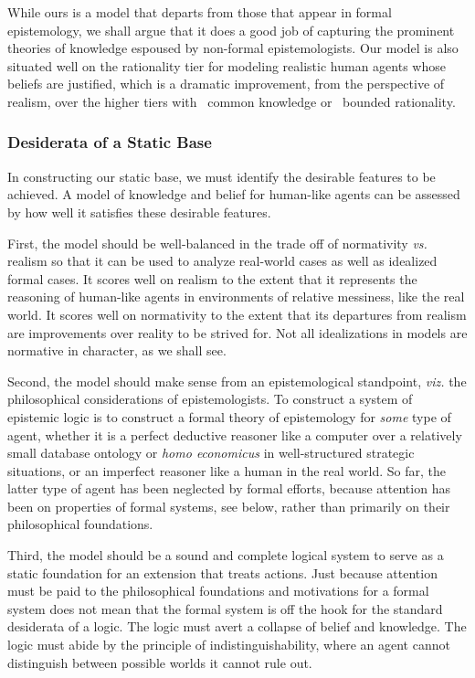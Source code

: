 While ours is a model that departs from those that appear in formal epistemology, we shall argue that it does a good job of capturing the prominent theories of knowledge espoused by non-formal epistemologists. Our model is also situated well on the rationality tier for modeling realistic human agents whose beliefs are justified, which is a dramatic improvement, from the perspective of realism, over the higher tiers with \SFive\ common knowledge or \SFive\ bounded rationality.

\subsubsection{Desiderata of a Static Base}
In constructing our static base, we must identify the desirable features to be achieved. A model of knowledge and belief for human-like agents can be assessed by how well it satisfies these desirable features. 

First, the model should be well-balanced in the trade off of normativity \emph{vs.} realism so that it can be used to analyze real-world cases as well as idealized formal cases. It scores well on realism to the extent that it represents the reasoning of human-like agents in environments of relative messiness, like the real world. It scores well on normativity to the extent that its departures from realism are improvements over reality to be strived for. Not all idealizations in models are normative in character, as we shall see.

Second, the model should make sense from an epistemological standpoint, \emph{viz.} the philosophical considerations of epistemologists. To construct a system of epistemic logic is to construct a formal theory of epistemology for \emph{some} type of agent, whether it is a perfect deductive reasoner like a computer over a relatively small database ontology or \emph{homo economicus} in well-structured strategic situations, or an imperfect reasoner like a human in the real world. So far, the latter type of agent has been neglected by formal efforts, because attention has been on properties of formal systems, see below, rather than primarily on their philosophical foundations. 

Third, the model should be a sound and complete logical system to serve as a static foundation for an extension that treats actions. Just because attention must be paid to the philosophical foundations and motivations for a formal system does not mean that the formal system is off the hook for the standard desiderata of a logic. The logic must avert a collapse of belief and knowledge. The logic must abide by the principle of indistinguishability, where an agent cannot distinguish between possible worlds it cannot rule out. 

